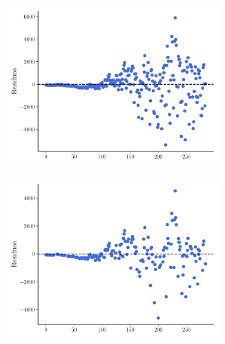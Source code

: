 \documentclass[twocolumn,aps,prl]{revtex4-1}
\begin{document}
\begin{figure}[ht!]
  \begin{subfigure}[b]{0.49\linewidth}
      \centering
      \includegraphics[width = 0.9\textwidth]{figuras/ex02-residuos.pdf}
      \caption{}
      \label{fig:figuras/ex02-residuos}
  \end{subfigure}\quad
  \begin{subfigure}[b]{0.49\linewidth}
      \centering
      \includegraphics[width = 0.9\textwidth]{figuras/ex02-residuos-sin-Finde.pdf}
      \caption{}
      \label{fig:figuras/ex02-residuos-sin-Finde}
  \end{subfigure}\quad
  \caption{}
\end{figure}
\end{document}
